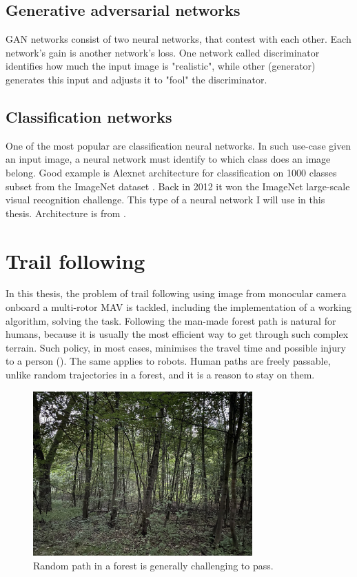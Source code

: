 \subsection{Generative adversarial networks}

GAN networks consist of two neural networks, that contest with each other. Each network's gain is another network's loss. One network called discriminator identifies how much the input image is "realistic", while other (generator) generates this input and adjusts it to "fool" the discriminator.

\subsection{Classification networks}

One of the most popular are classification neural networks. In such use-case given an input image, a neural network must identify to which class does an image belong. Good example is Alexnet architecture for classification on 1000 classes subset from the ImageNet dataset \cite{krizhevsky2012imagenet}. Back in 2012 it won the ImageNet large-scale visual recognition challenge. This type of a neural network I will use in this thesis. Architecture is from \cite{giusti2016machine}.

\section{Trail following}

In this thesis, the problem of trail following using image from monocular camera onboard a multi-rotor MAV is tackled, including the implementation of a working algorithm, solving the task. Following the man-made forest path is natural for humans, because it is usually the most efficient way to get through such complex terrain. Such policy, in most cases, minimises the travel time and possible injury to a person (). The same applies to robots. Human paths are freely passable, unlike random trajectories in a forest, and it is a reason to stay on them.

\begin{figure}[!h]
  \centering
  \includegraphics[width=0.75\textwidth]{./fig/photos/challenging_path.jpg}

  \caption{Random path in a forest is generally challenging to pass.}
  \label{fig:challenging_path}
\end{figure}

